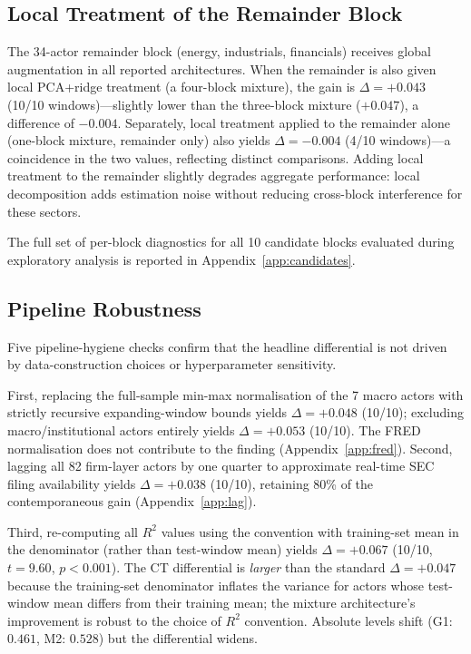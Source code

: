\documentclass[11pt,a4paper]{article}
\begin{document}
\subsection{Local Treatment of the Remainder Block}

The 34-actor remainder block (energy, industrials, financials) receives global augmentation in all reported architectures. When the remainder is also given local PCA+ridge treatment (a four-block mixture), the gain is $\Delta = +0.043$ (10/10 windows)---slightly lower than the three-block mixture ($+0.047$), a difference of $-0.004$. Separately, local treatment applied to the remainder alone (one-block mixture, remainder only) also yields $\Delta = -0.004$ (4/10 windows)---a coincidence in the two values, reflecting distinct comparisons. Adding local treatment to the remainder slightly degrades aggregate performance: local decomposition adds estimation noise without reducing cross-block interference for these sectors.

The full set of per-block diagnostics for all 10 candidate blocks evaluated during exploratory analysis is reported in Appendix~\ref{app:candidates}.

\subsection{Pipeline Robustness}

Five pipeline-hygiene checks confirm that the headline differential is not driven by data-construction choices or hyperparameter sensitivity.

First, replacing the full-sample min-max normalisation of the 7 macro actors with strictly recursive expanding-window bounds yields $\Delta = +0.048$ (10/10); excluding macro/institutional actors entirely yields $\Delta = +0.053$ (10/10). The FRED normalisation does not contribute to the finding (Appendix~\ref{app:fred}). Second, lagging all 82 firm-layer actors by one quarter to approximate real-time SEC filing availability yields $\Delta = +0.038$ (10/10), retaining 80\% of the contemporaneous gain (Appendix~\ref{app:lag}).

Third, re-computing all $R^2$ values using the \citet{stock2002forecasting} convention with training-set mean in the denominator (rather than test-window mean) yields $\Delta = +0.067$ (10/10, $t = 9.60$, $p < 0.001$). The CT differential is \emph{larger} than the standard $\Delta = +0.047$ because the training-set denominator inflates the variance for actors whose test-window mean differs from their training mean; the mixture architecture's improvement is robust to the choice of $R^2$ convention. Absolute levels shift (G1: $0.461$, M2: $0.528$) but the differential widens.
\end{document}
